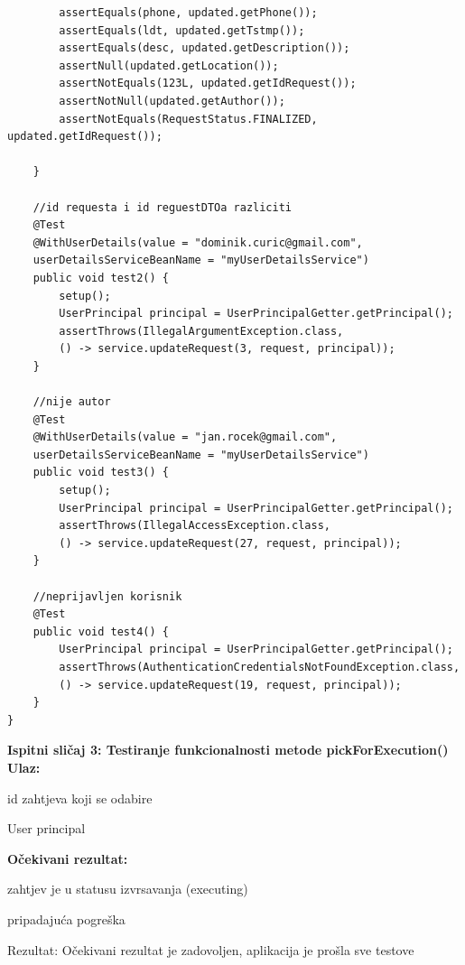 \begin{verbatim}
		assertEquals(phone, updated.getPhone());
		assertEquals(ldt, updated.getTstmp());
		assertEquals(desc, updated.getDescription());
		assertNull(updated.getLocation());
		assertNotEquals(123L, updated.getIdRequest());
		assertNotNull(updated.getAuthor());
		assertNotEquals(RequestStatus.FINALIZED, updated.getIdRequest());

	}

	//id requesta i id reguestDTOa razliciti
	@Test
	@WithUserDetails(value = "dominik.curic@gmail.com",
	userDetailsServiceBeanName = "myUserDetailsService")
	public void test2() {
		setup();
		UserPrincipal principal = UserPrincipalGetter.getPrincipal();
		assertThrows(IllegalArgumentException.class, 
		() -> service.updateRequest(3, request, principal));
	}

	//nije autor
	@Test
	@WithUserDetails(value = "jan.rocek@gmail.com",
	userDetailsServiceBeanName = "myUserDetailsService")
	public void test3() {
		setup();
		UserPrincipal principal = UserPrincipalGetter.getPrincipal();
		assertThrows(IllegalAccessException.class,
		() -> service.updateRequest(27, request, principal));
	}

	//neprijavljen korisnik
	@Test
	public void test4() {
		UserPrincipal principal = UserPrincipalGetter.getPrincipal();
		assertThrows(AuthenticationCredentialsNotFoundException.class,
		() -> service.updateRequest(19, request, principal));
	}
}
			\end{verbatim}
			
			\medskip
			
			\noindent \textbf{Ispitni sličaj 3: Testiranje funkcionalnosti metode pickForExecution()}\\
			
			\medskip
            \noindent\textbf{Ulaz:}
            \begin{packed_enum}
            \item id zahtjeva koji se odabire
            \item User principal
            \end{packed_enum}
            
            \noindent\textbf{Očekivani rezultat:}
            \begin{packed_enum}
            \item zahtjev je u statusu izvrsavanja (executing)
            \item pripadajuća pogreška
            \end{packed_enum}
            
            \noindent \text
            Rezultat: Očekivani rezultat je zadovoljen, aplikacija je prošla sve testove \\
            
